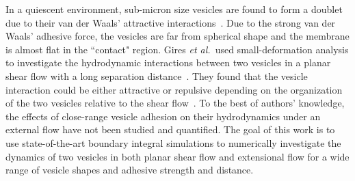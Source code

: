\documentclass[prf,superscriptaddress,showkeys,longbibliography]{revtex4-1}
\begin{document}
%

In a quiescent environment, sub-micron size vesicles are found to form a
doublet due to their van der Waals' attractive
interactions~\cite{RamachandranAndersonLealIsraelachvili2010_Langmuir}.
Due to the strong van der Waals' adhesive force, the vesicles are far
from spherical shape and the membrane is almost flat in the ``contact"
region. Gires {\em et al.}~used small-deformation analysis to
investigate the hydrodynamic interactions between two vesicles in a
planar shear flow with a long separation
distance~\cite{GiresDankerMisbah2012_PRE}.  They found that the vesicle
interaction could be either attractive or repulsive depending on the
organization of the two vesicles relative to the shear
flow~\cite{gir-sri-mis-pod-cou2014}. To the best of authors' knowledge,
the effects of close-range vesicle adhesion on their hydrodynamics under
an external flow have not been studied and quantified. The goal of this
work is to use state-of-the-art boundary integral simulations to
numerically investigate the dynamics of two vesicles in both planar
shear flow and extensional flow for a wide range of vesicle shapes and
adhesive strength and distance.
\end{document}
